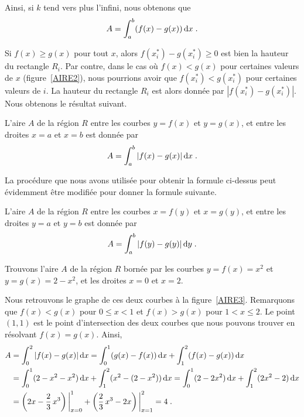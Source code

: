 {Ainsi, si $k$ tend vers plus l'infini, nous obtenons que
\[
A = \int_a^b (f(x)-g(x))\,\mathrm{d}x \; .
\]

Si $f(x) \geq g(x)$ pour tout $x$, alors
$f(x_i^\ast)-g(x_i^\ast) \geq 0$ est bien la hauteur du rectangle
$R_i$.  Par contre, dans le cas où $f(x) < g(x)$ pour certaines
valeurs de $x$ (figure~\ref{AIRE2}), nous pourrions avoir que
$f(x_i^\ast) < g(x_i^\ast)$ pour certaines valeurs de $i$.
La hauteur du rectangle $R_i$ est alors donnée par
$|f(x_i^\ast)-g(x_i^\ast)|$.  Nous obtenons le résultat suivant.


\begin{meth}
L'aire $A$ de la région $R$ entre les courbes $y=f(x)$ et $y=g(x)$, et
entre les droites $x=a$ et $x=b$ est donnée par
\[
A = \int_a^b |f(x)-g(x)|\,\mathrm{d}x \; .
\]
\end{meth}

La procédure que nous avons utilisée pour obtenir la formule ci-dessus peut
évidemment être modifiée pour donner la formule suivante.

\begin{meth}
L'aire $A$ de la région $R$ entre les courbes $x=f(y)$ et $x=g(y)$, et
entre les droites $y=a$ et $y=b$ est donnée par
\[
A = \int_a^b |f(y)-g(y)|\,\mathrm{d}y \; .
\]
\end{meth}

\begin{egg}
Trouvons l'aire $A$ de la région $R$ bornée par les courbes $y=f(x)=x^2$ et
$y=g(x)=2-x^2$, et les droites $x=0$ et $x=2$.

Nous retrouvons le graphe de ces deux courbes à la figure~\ref{AIRE3}.
Remarquons que $f(x)<g(x)$ pour $0\leq x < 1$ et $f(x)>g(x)$ pour $1<x\leq 2$.
Le point $(1,1)$ est le point d'intersection des deux courbes que nous
pouvons trouver en résolvant $f(x)=g(x)$.  Ainsi,
\begin{align*}
A &= \int_0^2 |f(x)-g(x)|\,\mathrm{d}x = \int_0^1 (g(x)-f(x))\,\mathrm{d}x
+ \int_1^2 (f(x)-g(x))\,\mathrm{d}x \\
&= \int_0^1 (2-x^2-x^2)\,\mathrm{d}x + \int_1^2(x^2-(2-x^2))\,\mathrm{d}x
= \int_0^1 (2-2x^2)\,\mathrm{d}x + \int_1^2(2x^2-2)\,\mathrm{d}x \\
&= \left( 2x-\frac{2}{3} \, x^3\right)\bigg|_{x=0}^1 +
\left( \frac{2}{3}\,x^3 - 2x \right)\bigg|_{x=1}^2 = 4 \; .
\end{align*}
\end{egg}

}
